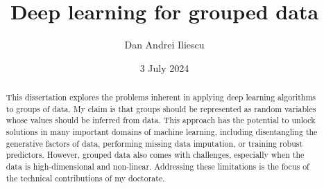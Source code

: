\documentclass{article}
\title{\bf Deep learning for grouped data}
\author{Dan Andrei Iliescu}
\date{3 July 2024}
\begin{document}
\maketitle

\begin{abstract}
    This dissertation explores the problems inherent in applying deep learning algorithms to groups of data. My claim is that groups should be represented as random variables whose values should be inferred from data. This approach has the potential to unlock solutions in many important domains of machine learning, including disentangling the generative factors of data, performing missing data imputation, or training robust predictors. However, grouped data also comes with challenges, especially when the data is high-dimensional and non-linear. Addressing these limitations is the focus of the technical contributions of my doctorate.
\end{abstract}
\end{document}

